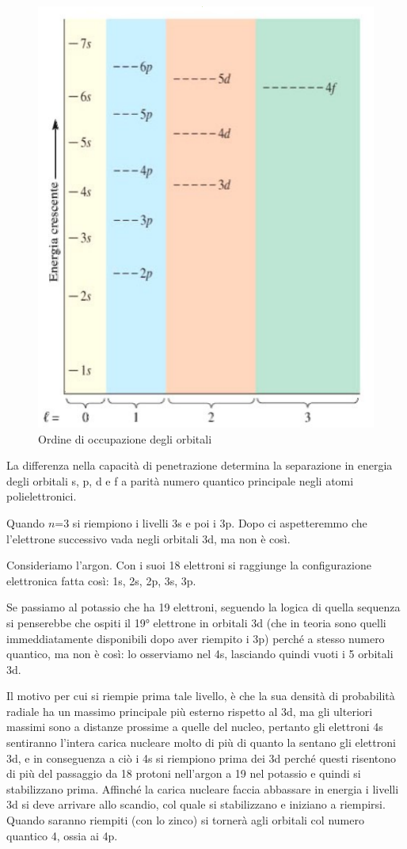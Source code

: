 \begin{figure}[htp]
  \centering
  \includegraphics[width=12cm]{immagini/livelli orbitali.png}
  \caption{Ordine di occupazione degli orbitali}
\end{figure}
La differenza nella capacità di penetrazione determina la separazione in energia degli orbitali s, p, d e f a parità numero quantico principale negli atomi polielettronici.

Quando $n$=3 si riempiono i livelli 3s e poi i 3p. Dopo ci aspetteremmo che l'elettrone successivo vada negli orbitali 3d, ma non è così.

Consideriamo l'argon. Con i suoi 18 elettroni si raggiunge la configurazione elettronica fatta così: 1s, 2s, 2p, 3s, 3p.

Se passiamo al potassio che ha 19 elettroni, seguendo la logica di quella sequenza si penserebbe che ospiti il 19° elettrone in orbitali 3d (che in teoria sono quelli immeddiatamente disponibili dopo aver riempito i 3p) perché a stesso numero quantico, ma non è così: lo osserviamo nel 4s, lasciando quindi vuoti i 5 orbitali 3d.

Il motivo per cui si riempie prima tale livello, è che la sua densità di probabilità radiale ha un massimo principale più esterno rispetto al 3d, ma gli ulteriori massimi sono a distanze prossime a quelle del nucleo, pertanto gli elettroni 4s sentiranno l'intera carica nucleare molto di più di quanto la sentano gli elettroni 3d, e in conseguenza a ciò i 4s si riempiono prima dei 3d perché questi risentono di più del passaggio da 18 protoni nell'argon a 19 nel potassio e quindi si stabilizzano prima. Affinché la carica nucleare faccia abbassare in energia i livelli 3d si deve arrivare allo scandio, col quale si stabilizzano e iniziano a riempirsi. Quando saranno riempiti (con lo zinco) si tornerà agli orbitali col numero quantico 4, ossia ai 4p.

